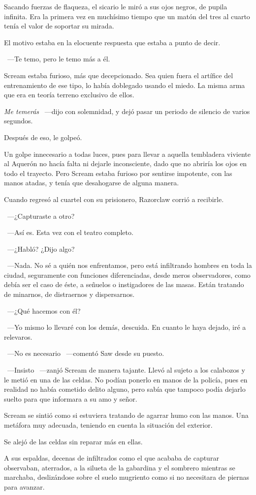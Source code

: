 Sacando fuerzas de flaqueza, el sicario le miró a sus ojos negros, de pupila infinita. Era la primera vez en muchísimo tiempo que un matón del tres al cuarto tenía el valor de soportar su mirada.

El motivo estaba en la elocuente respuesta que estaba a punto de decir.

~---Te temo, pero le temo más a él.

Scream estaba furioso, más que decepcionado. Sea quien fuera el artífice del entrenamiento de ese tipo, lo había doblegado usando el miedo. La misma arma que era en teoría terreno exclusivo de ellos.

\emph{Me temerás} ~---dijo con solemnidad, y dejó pasar un periodo de silencio de varios segundos.

Después de eso, le golpeó.

Un golpe innecesario a todas luces, pues para llevar a aquella tembladera viviente al Aquerón no hacía falta ni dejarle inconsciente, dado que no abriría los ojos en todo el trayecto. Pero Scream estaba furioso por sentirse impotente, con las manos atadas, y tenía que desahogarse de alguna manera.

Cuando regresó al cuartel con su prisionero, Razorclaw corrió a recibirle.

~---¿Capturaste a otro?

~---Así es. Esta vez con el teatro completo.

~---¿Habló? ¿Dijo algo?

~---Nada. No sé a quién nos enfrentamos, pero está infiltrando hombres en toda la ciudad, seguramente con funciones diferenciadas, desde meros observadores, como debía ser el caso de éste, a señuelos o instigadores de las masas. Están tratando de minarnos, de distraernos y dispersarnos.

~---¿Qué hacemos con él?

~---Yo mismo lo llevaré con los demás, descuida. En cuanto le haya dejado, iré a relevaros.

~---No es necesario ~---comentó Saw desde su puesto.

~---Insisto ~---zanjó Scream de manera tajante. Llevó al sujeto a los calabozos y le metió en una de las celdas. No podían ponerlo en manos de la policía, pues en realidad no había cometido delito alguno, pero sabía que tampoco podía dejarlo suelto para que informara a su amo y señor.

Scream se sintió como si estuviera tratando de agarrar humo con las manos. Una metáfora muy adecuada, teniendo en cuenta la situación del exterior.

Se alejó de las celdas sin reparar más en ellas.

A sus espaldas, decenas de infiltrados como el que acababa de capturar observaban, aterrados, a la silueta de la gabardina y el sombrero mientras se marchaba, deslizándose sobre el suelo mugriento como si no necesitara de piernas para avanzar.

\endinput
